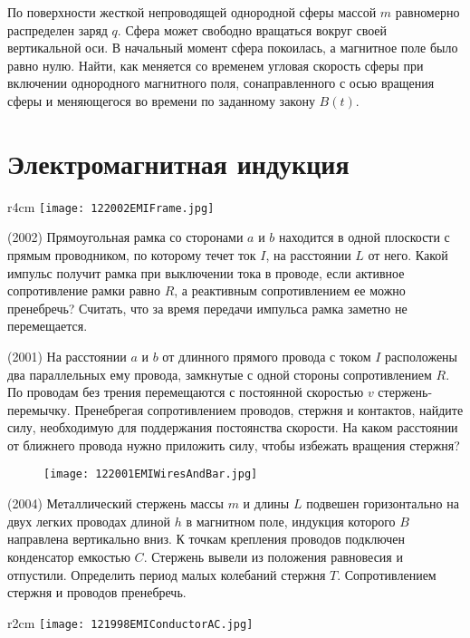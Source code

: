 \AddProb По поверхности жесткой непроводящей однородной сферы массой $m$ равномерно распределен заряд $q$. 
Сфера может свободно вращаться вокруг своей вертикальной оси. В начальный момент сфера покоилась, а магнитное поле было равно нулю. 
Найти, как меняется со временем угловая скорость сферы при включении однородного магнитного поля, 
сонаправленного с осью вращения сферы и меняющегося во времени по заданному закону $B(t)$.


\section{Электромагнитная индукция}

\begin{wrapfigure}{r}{4cm}
\texttt{[image: 122002EMIFrame.jpg]}
\end{wrapfigure}

\AddProb (2002) Прямоугольная рамка со сторонами $a$ и $b$ находится в одной плоскости с прямым проводником, 
по которому течет ток $I$, на расстоянии $L$ от него. Какой импульс получит рамка при выключении тока в проводе, 
если активное сопротивление рамки равно $R$, а реактивным сопротивлением ее можно пренебречь? 
Считать, что за время передачи импульса рамка заметно не перемещается.

\AddProb (2001) На расстоянии $a$ и $b$ от длинного прямого провода с током $I$ расположены два параллельных ему провода, 
замкнутые с одной стороны сопротивлением $R$. По проводам без трения перемещаются с постоянной скоростью $v$ стержень-перемычку. 
Пренебрегая сопротивлением проводов, стержня и контактов, найдите силу, необходимую для поддержания постоянства скорости. 
На каком расстоянии от ближнего провода нужно приложить силу, чтобы избежать вращения стержня?

\begin{figure}[!h]
\texttt{[image: 122001EMIWiresAndBar.jpg]}
\end{figure}

\AddProb (2004) Металлический стержень массы $m$ и длины $L$ подвешен горизонтально на двух легких проводах длиной $h$ в магнитном поле, 
индукция которого $B$ направлена вертикально вниз. К точкам крепления проводов подключен конденсатор емкостью $C$. 
Стержень вывели из положения равновесия и отпустили. Определить период малых колебаний стержня $T$. Сопротивлением стержня и проводов пренебречь.

\begin{wrapfigure}{r}{2cm}
\texttt{[image: 121998EMIConductorAC.jpg]}
\end{wrapfigure}

